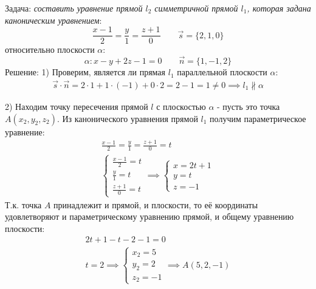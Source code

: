 \begin{eg}
  Задача: \textit{составить уравнение прямой $l_2$ симметричной прямой $l_1$, которая задана каноническим уравнением}: \[
  \frac{x - 1}{2} = \frac{y}{1} = \frac{z + 1}{0} \qquad \vec{s} = \{2, 1, 0\} 
  \] 
  относительно плоскости $\alpha$: \[
    \alpha: x - y + 2z - 1 = 0 \qquad \vec{n} = \{1, -1, 2\} 
  \] 
  Решение:
  1) Проверим, является ли прямая $l_1$ параллельной плоскости $\alpha$:
  \begin{gather*}
    \vec{s} \cdot \vec{n} = 2 \cdot 1 + 1 \cdot (-1) + 0 \cdot 2 = 2 - 1 = 1 \neq 0 \implies l_1 \not \parallel \alpha
  \end{gather*}

  2) Находим точку пересечения прямой $l$ с плоскостью $\alpha$ - пусть это точка $A(x_2, y_2, z_2)$.
  Из канонического уравнения прямой $l_1$ получим параметрическое уравнение:
  \begin{gather*}
    \frac{x - 1}{2} = \frac{y}{1} = \frac{z + 1}{0} = t \\
    \begin{cases}
      \frac{x - 1}{2} = t \\
      \frac{y}{1} = t \\
      \frac{z + 1}{0} = t
    \end{cases} \implies
    \begin{cases}
      x = 2t + 1 \\
      y = t \\
      z = -1
    \end{cases}
  \end{gather*}
  Т.к. точка $A$ принадлежит и прямой, и плоскости, то её координаты удовлетворяют и параметрическому уравнению прямой, и общему уравнению плоскости:
  \begin{gather*}
    2t + 1 - t - 2 - 1 = 0 \\
    t = 2 \implies \begin{cases}
      x_2 = 5 \\
      y_2 = 2 \\
      z_2 = -1
    \end{cases} \implies A(5, 2, -1)
  \end{gather*}


\end{eg}
